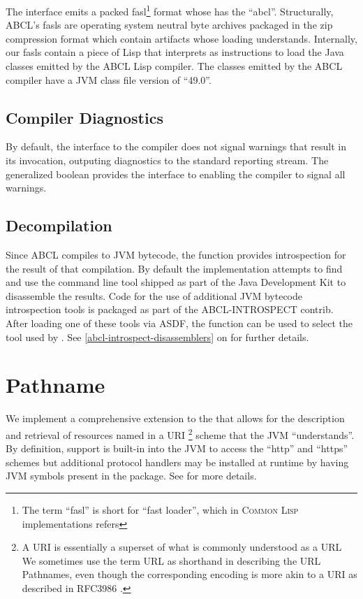 \documentclass[10pt]{book}
\begin{document}
The  interface emits a packed fasl\footnote{The
term ``fasl'' is short for ``fast loader'', which in \textsc{Common
  Lisp} implementations refers} format whose  has
the  ``abcl''.  Structurally, \textsc{ABCL}'s fasls are
operating system neutral byte archives packaged in the zip compression
format which contain artifacts whose loading 
understands.  Internally, our fasls contain a piece of Lisp that
 interprets as instructions to load the Java classes
emitted by the \textsc{ABCL} Lisp compiler.  The classes emitted by
the \textsc{ABCL} compiler have a JVM class file version of ``49.0''.


\subsection{Compiler Diagnostics}

By default, the interface to the compiler does not signal warnings
that result in its invocation, outputing diagnostics to the standard
reporting stream.  The generalized boolean
 provides the interface to
enabling the compiler to signal all warnings.

\subsection{Decompilation}

\label{CL:DISASSEMBLE}
Since \textsc{ABCL} compiles to JVM bytecode, the
 function provides introspection for the result
of that compilation.  By default the implementation attempts to find
and use the  command line tool shipped as part of the Java
Development Kit to disassemble the results.  Code for the use of
additional JVM bytecode introspection tools is packaged as part of the
ABCL-INTROSPECT contrib.  After loading one of these tools via ASDF,
the  function can be used to select the
tool used by .  See
\ref{abcl-introspect-disassemblers}
on \pageref{abcl-introspect-disassemblers} for further details.

\section{Pathname}

We implement a comprehensive extension to the  that
allows for the description and retrieval of resources named in a
\textsc{URI} \footnote{A \textsc{URI} is essentially a superset of
what is commonly understood as a \textsc{URL} We sometimes use the
term URL as shorthand in describing the URL Pathnames, even though the
corresponding encoding is more akin to a URI as described in RFC3986
\cite{rfc3986}.}  scheme that the \textsc{JVM} ``understands''.  By
definition, support is built-in into the JVM to access the ``http''
and ``https'' schemes but additional protocol handlers may be
installed at runtime by having \textsc{JVM} symbols present in the
 package. See \cite{maso2000} for more
details.
\end{document}
